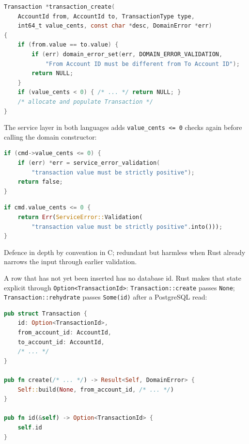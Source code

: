 \begin{lstlisting}[language=C, caption={transaction.c --- Domain rules live in one
function; callers must check the return pointer.}]
Transaction *transaction_create(
    AccountId from, AccountId to, TransactionType type,
    int64_t value_cents, const char *desc, DomainError *err)
{
    if (from.value == to.value) {
        if (err) domain_error_set(err, DOMAIN_ERROR_VALIDATION,
            "From Account ID must be different from To Account ID");
        return NULL;
    }
    if (value_cents < 0) { /* ... */ return NULL; }
    /* allocate and populate Transaction */
}
\end{lstlisting}

The service layer in both languages adds \texttt{value\_cents <= 0} checks again before
calling the domain constructor:

\begin{lstlisting}[language=C, caption={transaction\_service.c --- Service rejects
non-positive amounts before \texttt{transaction\_create}.}]
if (cmd->value_cents <= 0) {
    if (err) *err = service_error_validation(
        "transaction value must be strictly positive");
    return false;
}
\end{lstlisting}

\begin{lstlisting}[language=Rust, caption={transaction.rs (service) --- Same guard
at the top of \texttt{record\_transaction}.}]
if cmd.value_cents <= 0 {
    return Err(ServiceError::Validation(
        "transaction value must be strictly positive".into()));
}
\end{lstlisting}

Defence in depth by convention in C; redundant but harmless when Rust already narrows
the input through earlier validation.

A row that has not yet been inserted has no database id. Rust makes that state explicit
through \texttt{Option<TransactionId>}: \texttt{Transaction::create} passes \texttt{None};
\texttt{Transaction::rehydrate} passes \texttt{Some(id)} after a PostgreSQL read:

\begin{lstlisting}[language=Rust, caption={transaction.rs (domain) --- \texttt{None}
means ``not persisted yet''; \texttt{Some} means reloaded from the database.}]
pub struct Transaction {
    id: Option<TransactionId>,
    from_account_id: AccountId,
    to_account_id: AccountId,
    /* ... */
}

pub fn create(/* ... */) -> Result<Self, DomainError> {
    Self::build(None, from_account_id, /* ... */)
}

pub fn id(&self) -> Option<TransactionId> {
    self.id
}
\end{lstlisting}


